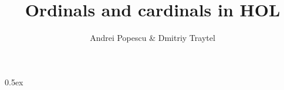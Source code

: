 \documentclass[11pt,a4paper]{article}
\begin{document}
\title{Ordinals and cardinals in HOL}
\author{Andrei Popescu \& Dmitriy Traytel}
\date{}
\maketitle

\tableofcontents

\parindent 0pt\parskip 0.5ex







%
%
\end{document}
